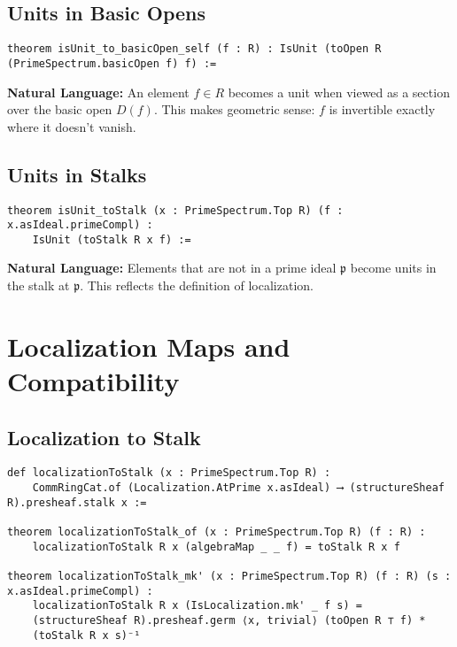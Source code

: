 \documentclass{article}
\theoremstyle{definition}
\begin{document}
\subsection{Units in Basic Opens}

\begin{lstlisting}
theorem isUnit_to_basicOpen_self (f : R) : IsUnit (toOpen R (PrimeSpectrum.basicOpen f) f) :=
\end{lstlisting}

\textbf{Natural Language:} An element $f \in R$ becomes a unit when viewed as a section over the basic open $D(f)$. This makes geometric sense: $f$ is invertible exactly where it doesn't vanish.

\subsection{Units in Stalks}

\begin{lstlisting}
theorem isUnit_toStalk (x : PrimeSpectrum.Top R) (f : x.asIdeal.primeCompl) :
    IsUnit (toStalk R x f) :=
\end{lstlisting}

\textbf{Natural Language:} Elements that are not in a prime ideal $\mathfrak{p}$ become units in the stalk at $\mathfrak{p}$. This reflects the definition of localization.

\section{Localization Maps and Compatibility}

\subsection{Localization to Stalk}

\begin{lstlisting}
def localizationToStalk (x : PrimeSpectrum.Top R) :
    CommRingCat.of (Localization.AtPrime x.asIdeal) ⟶ (structureSheaf R).presheaf.stalk x :=

theorem localizationToStalk_of (x : PrimeSpectrum.Top R) (f : R) :
    localizationToStalk R x (algebraMap _ _ f) = toStalk R x f

theorem localizationToStalk_mk' (x : PrimeSpectrum.Top R) (f : R) (s : x.asIdeal.primeCompl) :
    localizationToStalk R x (IsLocalization.mk' _ f s) =
    (structureSheaf R).presheaf.germ ⟨x, trivial⟩ (toOpen R ⊤ f) *
    (toStalk R x s)⁻¹
\end{lstlisting}
\end{document}
